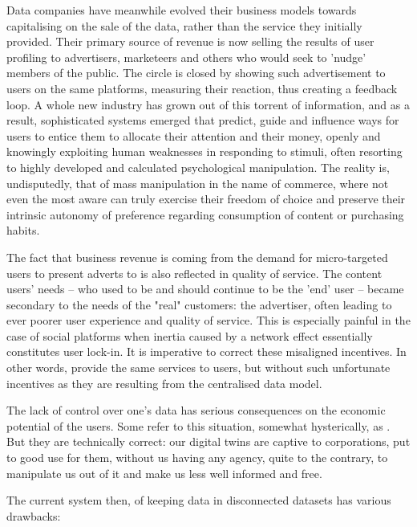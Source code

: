 Data companies have meanwhile evolved their business models towards capitalising on the sale of the data, rather than the service they initially provided. Their primary source of revenue is now selling the results of user profiling to advertisers, marketeers and others who would seek to 'nudge' members of the public. The circle is closed by showing such advertisement to users on the same platforms, measuring their reaction, thus creating a feedback loop. A whole new industry has grown out of this torrent of information, and as a result, sophisticated systems emerged that predict, guide and influence ways for users to entice them to allocate their attention and their money, openly and knowingly exploiting human weaknesses in responding to stimuli, often resorting to highly developed and calculated psychological manipulation. The reality is, undisputedly, that of mass manipulation in the name of commerce, where not even the most aware can truly exercise their freedom of choice and preserve their intrinsic autonomy of preference regarding consumption of content or purchasing habits.

The fact that business revenue is coming from the demand for micro-targeted users to present adverts to is also reflected in quality of service. The content users' needs – who used to be and should continue to be the 'end' user – became secondary to the needs of the "real" customers: the advertiser, often leading to ever poorer user experience and quality of service. This is especially painful in the case of social platforms when  inertia caused by a network effect essentially constitutes user lock-in. It is imperative to correct these misaligned incentives. In other words, provide the same services to users, but without such unfortunate incentives as they are resulting from the centralised data model.

The lack of control over one's data has serious consequences on the economic potential of the users. Some refer to this situation, somewhat hysterically, as . But they are technically correct: our digital twins are  captive to corporations, put to good use for them, without us having any agency, quite to the contrary, to manipulate us out of it and make us less well informed and free. 

The current system then, of keeping data in disconnected datasets has various drawbacks: 

